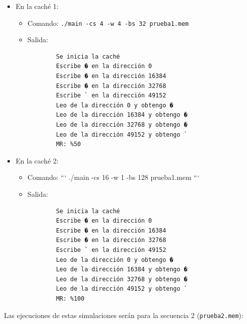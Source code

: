 \documentclass[titlepage,a4paper]{article}
\begin{document}
\begin{itemize}
    \item En la caché 1:
    
    \begin{itemize}
        \item Comando: \verb|./main -cs 4 -w 4 -bs 32 prueba1.mem|
        \item Salida:
            \begin{verbatim}
        Se inicia la caché
        Escribe � en la dirección 0
        Escribe � en la dirección 16384
        Escribe � en la dirección 32768
        Escribe ` en la dirección 49152
        Leo de la dirección 0 y obtengo �
        Leo de la dirección 16384 y obtengo �
        Leo de la dirección 32768 y obtengo �
        Leo de la dirección 49152 y obtengo `
        MR: %50
            \end{verbatim}
    \end{itemize}
    
    \item En la caché 2:
    \begin{itemize}
        \item Comando: ``` ./main -cs 16 -w 1 -bs 128 prueba1.mem ```
        \item Salida:
            \begin{verbatim}
        Se inicia la caché
        Escribe � en la dirección 0
        Escribe � en la dirección 16384
        Escribe � en la dirección 32768
        Escribe ` en la dirección 49152
        Leo de la dirección 0 y obtengo �
        Leo de la dirección 16384 y obtengo �
        Leo de la dirección 32768 y obtengo �
        Leo de la dirección 49152 y obtengo `
        MR: %100
            \end{verbatim}
    \end{itemize}
\end{itemize}

Las ejecuciones de estas simulaciones serán para la secuencia 2 (\verb|prueba2.mem|):
\end{document}
